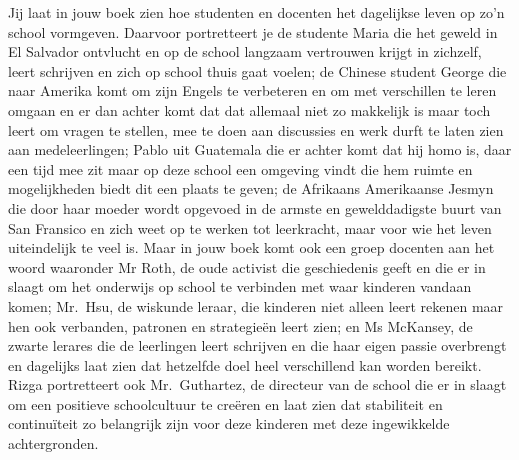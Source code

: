 \documentclass[]{book}
\begin{document}
Jij laat in jouw boek zien hoe studenten en docenten het dagelijkse
leven op zo'n school vormgeven. Daarvoor portretteert je de studente
Maria die het geweld in El Salvador ontvlucht en op de school langzaam
vertrouwen krijgt in zichzelf, leert schrijven en zich op school thuis
gaat voelen; de Chinese student George die naar Amerika komt om zijn
Engels te verbeteren en om met verschillen te leren omgaan en er dan
achter komt dat dat allemaal niet zo makkelijk is maar toch leert om
vragen te stellen, mee te doen aan discussies en werk durft te laten
zien aan medeleerlingen; Pablo uit Guatemala die er achter komt dat hij
homo is, daar een tijd mee zit maar op deze school een omgeving vindt
die hem ruimte en mogelijkheden biedt dit een plaats te geven; de
Afrikaans Amerikaanse Jesmyn die door haar moeder wordt opgevoed in de
armste en gewelddadigste buurt van San Fransico en zich weet op te
werken tot leerkracht, maar voor wie het leven uiteindelijk te veel is.
Maar in jouw boek komt ook een groep docenten aan het woord waaronder Mr
Roth, de oude activist die geschiedenis geeft en die er in slaagt om het
onderwijs op school te verbinden met waar kinderen vandaan komen;
Mr.~Hsu, de wiskunde leraar, die kinderen niet alleen leert rekenen maar
hen ook verbanden, patronen en strategieën leert zien; en Ms McKansey,
de zwarte lerares die de leerlingen leert schrijven en die haar eigen
passie overbrengt en dagelijks laat zien dat hetzelfde doel heel
verschillend kan worden bereikt. Rizga portretteert ook Mr.~Guthartez,
de directeur van de school die er in slaagt om een positieve
schoolcultuur te creëren en laat zien dat stabiliteit en continuïteit zo
belangrijk zijn voor deze kinderen met deze ingewikkelde achtergronden.
\end{document}
